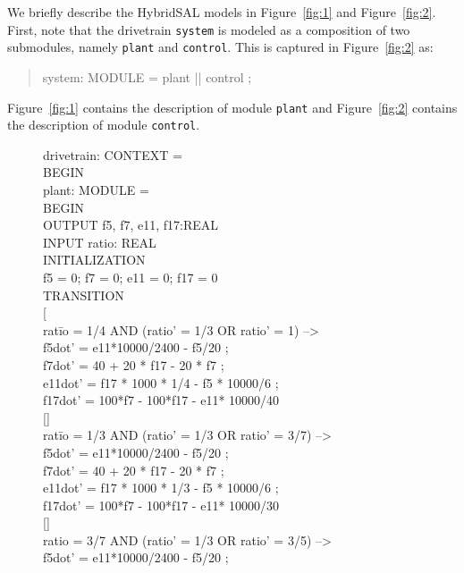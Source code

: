 \documentclass{llncs}
\begin{document}
We briefly describe the
HybridSAL models in Figure~\ref{fig:1} and Figure~\ref{fig:2}.
First, note that the drivetrain {\tt{system}} is modeled as a composition
of two submodules, namely {\tt{plant}} and {\tt{control}}.
This is captured in Figure~\ref{fig:2} as:
\begin{quote}
\begin{tt}
system: MODULE  = plant || control ;
\end{tt}
\end{quote}
Figure~\ref{fig:1} contains the description of module {\tt{plant}}
and 
Figure~\ref{fig:2} contains the description of module {\tt{control}}.


\begin{figure}[htb!]
\begin{tt}
\begin{tabbing}
drivetrain: CONTEXT = 
\\
BEGIN
\\
plant: MODULE =
\\
BEGIN
\\
OUTPUT f5, f7, e11, f17:REAL
\\
INPUT ratio: REAL
\\
INI\=TIALIZATION
\\ \>
  f5 = 0; f7 = 0; e11 = 0; f17 = 0
\\
TRANSITION
\\
\mbox{[}
\\
rat\=io = 1/4 AND (ratio' = 1/3 OR ratio' = 1) -->
\+
\\ 
  f5dot' = e11*10000/2400 - f5/20 ;
\\
  f7dot' = 40 + 20 * f17 - 20 * f7 ;
\\
  e11dot' = f17 * 1000 * 1/4 - f5 * 10000/6 ;
\\
  f17dot' = 100*f7 - 100*f17 - e11* 10000/40
\-
\\ 
 \mbox{[]}
\\ 
rat\=io = 1/3 AND (ratio' = 1/3 OR ratio' = 3/7) --> 
\\ \>
  f5dot' = e11*10000/2400 - f5/20 ;
\\ \>
  f7dot' = 40 + 20 * f17 - 20 * f7 ;
\\ \>
  e11dot' = f17 * 1000 * 1/3 - f5 * 10000/6 ;
\\ \>
  f17dot' = 100*f7 - 100*f17 - e11* 10000/30
\\
 \mbox{[]}
\\
ratio = 3/7 AND (ratio' = 1/3 OR ratio' = 3/5) --> 
\\ \>
  f5dot' = e11*10000/2400 - f5/20 ;

\end{tabbing}
\end{tt}
\end{figure}
\end{document}
